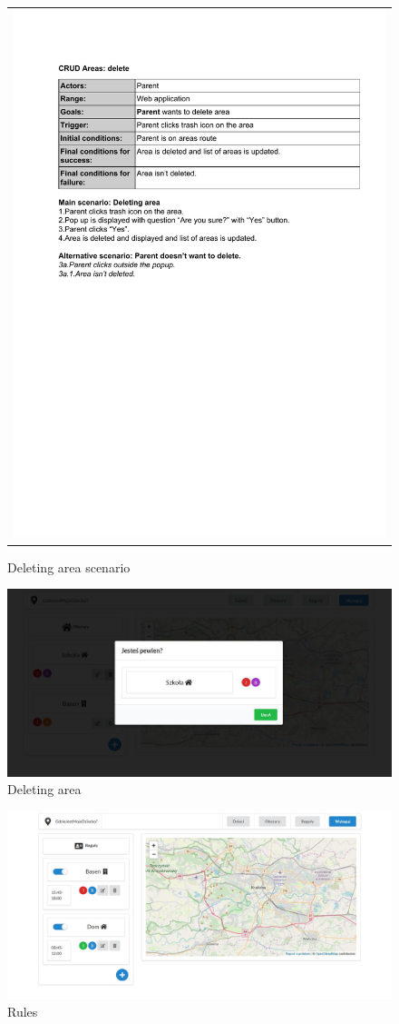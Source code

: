 \documentclass{sprawozdanie-agh}
\begin{document}
    	\begin{figure}[H]
    		\centering
    		\begin{tabular}{c}
    			\includegraphics[width=.80\textwidth]{deA_cropped}
    		\end{tabular}
    		\caption{Deleting area scenario}
    	\end{figure}

    	\begin{figure}[H]
    		\centering
    		\includegraphics[width=.80\textwidth]{deleteArea}
    		\caption{Deleting area}
    	\end{figure}

    	\begin{figure}[H]
    		\centering
    		\includegraphics[width=.80\textwidth]{rules}
    		\caption{Rules}
    	\end{figure}
\end{document}

